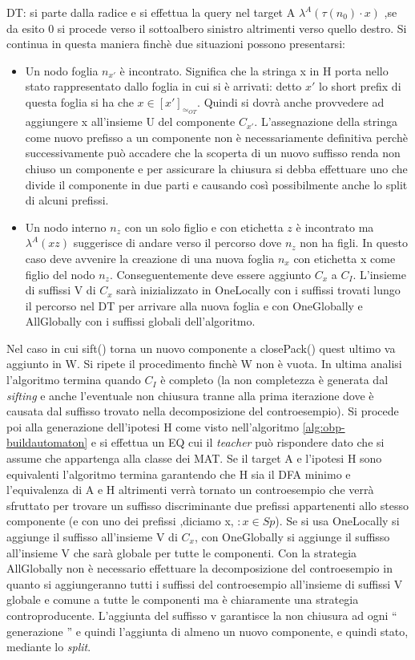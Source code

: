 \ac{DT}: si parte dalla radice e si effettua la query nel target A $\lambda^{A}(\tau(n_{0})\cdot{}x)$ ,se da esito 0 si procede verso il sottoalbero sinistro altrimenti verso quello destro. Si continua in questa maniera finchè due situazioni possono presentarsi:
\begin{itemize}
\item Un nodo foglia $n_{x'}$ è incontrato. Significa che la stringa x in \ac{H} porta nello stato rappresentato dallo foglia in cui si è arrivati: detto $x'$ lo short prefix di questa foglia si ha che $x \in [x']_{\simeq_{OT}}$. Quindi si dovrà anche provvedere ad aggiungere x all'insieme U del componente $C_{x'}$. L'assegnazione della stringa come nuovo prefisso a un componente non è necessariamente definitiva perchè successivamente può accadere che la scoperta di un nuovo suffisso renda non chiuso un componente e per assicurare la chiusura si debba effettuare uno  che divide il componente in due parti e causando così possibilmente anche lo split di alcuni prefissi.
\item
Un nodo interno $n_{z}$ con un solo figlio e con etichetta $z$ è incontrato ma  $\lambda^{A}(xz)$ suggerisce di andare verso il percorso dove $n_{z}$ non ha figli. In questo caso deve avvenire la creazione di una nuova foglia $n_{x}$ con etichetta x come figlio del nodo $n_{z}$. Conseguentemente deve essere aggiunto $C_x$ a $C_I$. L'insieme di suffissi V di $C_x$ sarà inizializzato in OneLocally con i suffissi trovati lungo il percorso nel \ac{DT} per arrivare alla nuova foglia e con OneGlobally e AllGlobally  con i suffissi globali dell'algoritmo.\end{itemize}
Nel caso in cui  sift() torna un nuovo componente a closePack() quest ultimo va aggiunto in W. Si ripete il procedimento finchè W non è vuota. In ultima analisi l'algoritmo termina quando $C_{I}$ è completo (la non completezza è generata dal \textit{sifting} e anche l'eventuale non chiusura tranne alla prima iterazione dove è causata dal suffisso trovato nella decomposizione del controesempio). Si procede poi alla generazione dell'ipotesi \ac{H} come visto nell'algoritmo \ref{alg:obp-buildautomaton} e si effettua un \ac{EQ} cui il \textit{teacher} può rispondere dato che si assume che appartenga alla classe dei \ac{MAT}. Se il target A e l'ipotesi \ac{H} sono equivalenti l'algoritmo termina garantendo che \ac{H} sia il DFA minimo e l'equivalenza di A e \ac{H} altrimenti verrà tornato un controesempio che verrà sfruttato per trovare un suffisso discriminante due prefissi appartenenti allo stesso componente (e con uno dei prefissi ,diciamo x, $: x \in Sp$). Se si usa OneLocally si aggiunge il suffisso all'insieme V di $C_{x}$, con OneGlobally si aggiunge il suffisso all'insieme V che sarà globale per tutte le componenti. Con la strategia AllGlobally non è necessario effettuare la decomposizione del controesempio in quanto si aggiungeranno tutti i suffissi del controesempio all'insieme di suffissi V globale e comune a tutte le componenti ma è chiaramente una strategia controproducente. L'aggiunta del suffisso v garantisce la non chiusura ad ogni  `` generazione  '' e quindi l'aggiunta di almeno un nuovo componente, e quindi stato, mediante lo \textit{split}.

